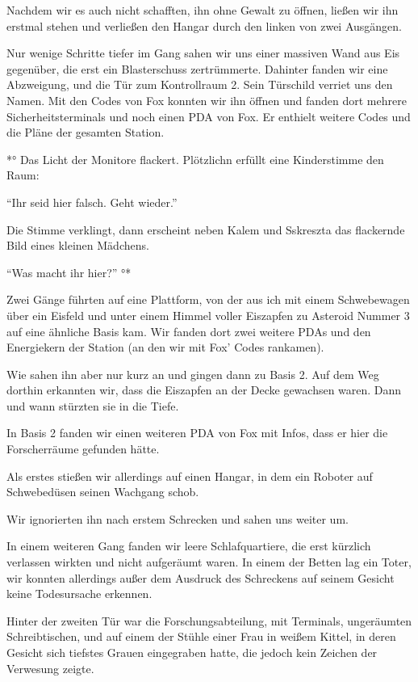 \documentclass[11pt]{article}
\begin{document}
Nachdem wir es auch nicht schafften, ihn ohne Gewalt zu öffnen, ließen
wir ihn erstmal stehen und verließen den Hangar durch den linken von
zwei Ausgängen.

Nur wenige Schritte tiefer im Gang sahen wir uns einer massiven Wand aus
Eis gegenüber, die erst ein Blasterschuss zertrümmerte. Dahinter fanden
wir eine Abzweigung, und die Tür zum Kontrollraum 2. Sein Türschild
verriet uns den Namen. Mit den Codes von Fox konnten wir ihn öffnen und
fanden dort mehrere Sicherheitsterminals und noch einen PDA von Fox. Er
enthielt weitere Codes und die Pläne der gesamten Station.

*° Das Licht der Monitore flackert. Plötzlichn erfüllt eine Kinderstimme
den Raum:

``Ihr seid hier falsch. Geht wieder.''

Die Stimme verklingt, dann erscheint neben Kalem und Sskreszta das
flackernde Bild eines kleinen Mädchens.

``Was macht ihr hier?'' °*

Zwei Gänge führten auf eine Plattform, von der aus ich mit einem
Schwebewagen über ein Eisfeld und unter einem Himmel voller Eiszapfen zu
Asteroid Nummer 3 auf eine ähnliche Basis kam. Wir fanden dort zwei
weitere PDAs und den Energiekern der Station (an den wir mit Fox' Codes
rankamen).

Wie sahen ihn aber nur kurz an und gingen dann zu Basis 2. Auf dem Weg
dorthin erkannten wir, dass die Eiszapfen an der Decke gewachsen waren.
Dann und wann stürzten sie in die Tiefe.

In Basis 2 fanden wir einen weiteren PDA von Fox mit Infos, dass er hier
die Forscherräume gefunden hätte.

Als erstes stießen wir allerdings auf einen Hangar, in dem ein Roboter
auf Schwebedüsen seinen Wachgang schob.

Wir ignorierten ihn nach erstem Schrecken und sahen uns weiter um.

In einem weiteren Gang fanden wir leere Schlafquartiere, die erst
kürzlich verlassen wirkten und nicht aufgeräumt waren. In einem der
Betten lag ein Toter, wir konnten allerdings außer dem Ausdruck des
Schreckens auf seinem Gesicht keine Todesursache erkennen.

Hinter der zweiten Tür war die Forschungsabteilung, mit Terminals,
ungeräumten Schreibtischen, und auf einem der Stühle einer Frau in
weißem Kittel, in deren Gesicht sich tiefstes Grauen eingegraben hatte,
die jedoch kein Zeichen der Verwesung zeigte.
\end{document}
